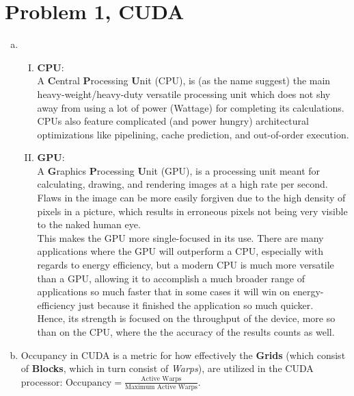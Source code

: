 \documentclass[fontsize=11pt, paper=a4, titlepage]{article}
\begin{document}
\section*{Problem 1, CUDA}
\begin{enumerate}[a)]

    \item
    \begin{enumerate}[I)]

        \item \textbf{CPU}: \\
A \textbf{C}entral \textbf{P}rocessing \textbf{U}nit (CPU), is (as the
name suggest) the main heavy-weight/heavy-duty versatile processing unit which
does not shy away from using a lot of power (Wattage) for completing its
calculations. CPUs also feature complicated (and power hungry) architectural
optimizations like pipelining, cache prediction, and out-of-order execution.

        \item \textbf{GPU}: \\
A \textbf{G}raphics \textbf{P}rocessing \textbf{U}nit (GPU), is a processing
unit meant for calculating, drawing, and rendering images at a high rate per
second. Flaws in the image can be more easily forgiven due to the high density
of pixels in a picture, which results in erroneous pixels not being very visible
to the naked human eye. \\

This makes the GPU more single-focused in its use. There are many applications
where the GPU will outperform a CPU, especially with regards to energy
efficiency, but a modern CPU is much more versatile than a GPU, allowing it to
accomplish a much broader range of applications so much faster that in some
cases it will win on energy-efficiency just because it finished the application
so much quicker. \\

Hence, its strength is focused on the throughput of the device, more so than on
the CPU, where the the accuracy of the results counts as well.

\end{enumerate}

    \item Occupancy in CUDA is a metric for how effectively the \textbf{Grids}
(which consist of \textbf{Blocks}, which in turn consist of \textit{Warps}), are
utilized in the CUDA processor: $\text{Occupancy} = \frac{\text{Active
Warps}}{\text{Maximum Active Warps}}$.


\end{enumerate}
\end{document}
